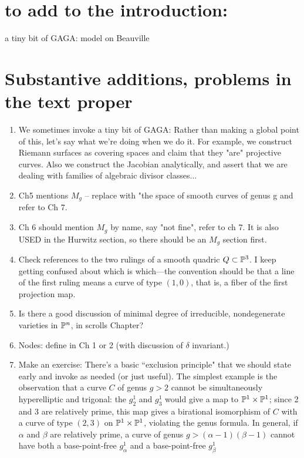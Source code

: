 \documentclass[12pt, leqno]{book}
\begin{document}
\section {to add to the introduction:}
\begin{enumerate}

a tiny bit of GAGA: model on Beauville
 \end{enumerate}
 

\section{Substantive additions, problems in the text proper}


\begin{enumerate}
 
 \item We sometimes invoke a tiny bit of GAGA: Rather than making a global point of this, let's say what we're doing when we do it. For example, we construct Riemann surfaces
 as covering spaces and claim that they "are" projective curves. Also we construct the Jacobian analytically, and assert that
 we are dealing with families of algebraic divisor classes...
 
 \item Ch5 mentions $M_g$ -- replace with "the space of smooth curves of genus g and refer to Ch 7.
 
 \item Ch 6 should mention $M_g$ by name, say "not fine", refer to ch 7. It is also USED in the Hurwitz section, so there should be an $M_g$ section first.
 
 
\item Check references to the two rulings of a smooth quadric $Q \subset \PP^3$. I keep getting confused about which is which---the convention should be that a line of the first ruling means a curve of type $(1,0)$, that is, a fiber of the first projection map.

\item Is there a good discussion of minimal degree of irreducible, nondegenerate varieties in $\PP^n$, in scrolls Chapter?

\item Nodes: define in Ch 1 or 2 (with discussion of $\delta$ invariant.)


\item Make an exercise: There's a basic ``exclusion principle" that we should state early and invoke as needed (or just useful). The simplest example is the observation that a curve $C$ of genus $g > 2$ cannot be simultaneously hyperelliptic and trigonal: the $g^1_2$ and $g^1_3$ would give a map to $\PP^1 \times \PP^1$; since 2 and 3 are relatively prime, this map gives a birational isomorphism of $C$ with a curve of type $(2,3)$ on $\PP^1 \times \PP^1$, violating the genus formula. In general, if $\alpha$ and $\beta$ are relatively prime, a curve of genus $g > (\alpha - 1)(\beta - 1)$ cannot have both a base-point-free $g^1_\alpha$ and a base-point-free $g^1_\beta$



\end{enumerate}
\end{document}
